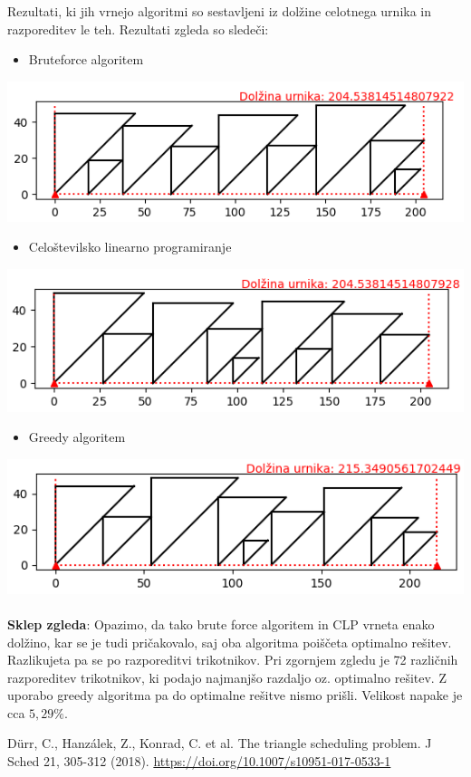 \documentclass[a4paper,12pt]{article}
\theoremstyle{definition}
\theoremstyle{plain}
\begin{document}
Rezultati, ki jih vrnejo algoritmi so sestavljeni iz dolžine celotnega urnika in razporeditev le teh. Rezultati
zgleda so sledeči:
\begin{itemize}
    \item Bruteforce algoritem
\end{itemize}    
    \includegraphics[]{sim_brut.png}
    \newpage
    \begin{itemize}
    \item Celoštevilsko linearno programiranje
\end{itemize}    
    \includegraphics[]{sim_clp.png}
    \begin{itemize}
    \item Greedy algoritem
\end{itemize}    
    \includegraphics[]{sim_greedy.png}
\\ \\
\textbf{Sklep zgleda}: Opazimo, da tako brute force algoritem in CLP vrneta enako dolžino,
kar se je tudi pričakovalo, saj oba algoritma poiščeta optimalno rešitev. Razlikujeta pa se po
razporeditvi trikotnikov. Pri zgornjem zgledu je 72 različnih razporeditev trikotnikov, ki podajo najmanjšo
razdaljo oz. optimalno rešitev. Z uporabo greedy algoritma pa do optimalne rešitve nismo
prišli. Velikost napake je cca $5,29\%$.

\newpage
\begin{thebibliography}{9}
          Dürr, C., Hanzálek, Z., Konrad, C. et al. The triangle scheduling problem. J Sched 21, 305-312 (2018). \href{https://doi.org/10.1007/s10951-017-0533-1}{https://doi.org/10.1007/s10951-017-0533-1 }
\end{thebibliography}
\end{document}
